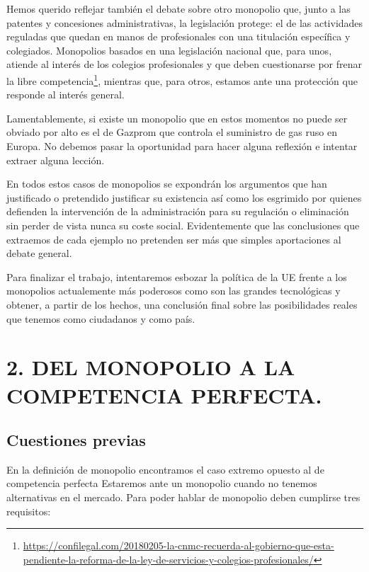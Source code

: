 \documentclass[
]{article}
\begin{document}
Hemos querido reflejar también el debate sobre otro monopolio que, junto
a las patentes y concesiones administrativas, la legislación protege: el
de las actividades reguladas que quedan en manos de profesionales con
una titulación específica y colegiados. Monopolios basados en una
legislación nacional que, para unos, atiende al interés de los colegios
profesionales y que deben cuestionarse por frenar la libre
competencia\footnote{\url{https://confilegal.com/20180205-la-cnmc-recuerda-al-gobierno-que-esta-pendiente-la-reforma-de-la-ley-de-servicios-y-colegios-profesionales/}},
mientras que, para otros, estamos ante una protección que responde al
interés general.

Lamentablemente, si existe un monopolio que en estos momentos no puede
ser obviado por alto es el de Gazprom que controla el suministro de gas
ruso en Europa. No debemos pasar la oportunidad para hacer alguna
reflexión e intentar extraer alguna lección.

En todos estos casos de monopolios se expondrán los argumentos que han
justificado o pretendido justificar su existencia así como los esgrimido
por quienes defienden la intervención de la administración para su
regulación o eliminación sin perder de vista nunca su coste social.
Evidentemente que las conclusiones que extraemos de cada ejemplo no
pretenden ser más que simples aportaciones al debate general.

Para finalizar el trabajo, intentaremos esbozar la política de la UE
frente a los monopolios actualemente más poderosos como son las grandes
tecnológicas y obtener, a partir de los hechos, una conclusión final
sobre las posibilidades reales que tenemos como ciudadanos y como país.

\hypertarget{del-monopolio-a-la-competencia-perfecta.}{%
\section{2. DEL MONOPOLIO A LA COMPETENCIA
PERFECTA.}\label{del-monopolio-a-la-competencia-perfecta.}}

\hypertarget{cuestiones-previas}{%
\subsection{Cuestiones previas}\label{cuestiones-previas}}

En la definición de monopolio encontramos el caso extremo opuesto al de
competencia perfecta Estaremos ante un monopolio cuando no tenemos
alternativas en el mercado. Para poder hablar de monopolio deben
cumplirse tres requisitos:
\end{document}
